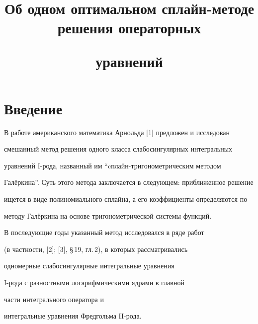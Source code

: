 

\title{Об одном оптимальном сплайн-методе решения операторных


уравнений}





\date{}




\pagestyle{plain} %







\maketitle


\label{begin}








\section*{Введение}





В работе американского математика Арнольда [1] предложен и исследован


смешанный метод решения одного класса слабосингулярных интегральных


уравнений I-рода, названный им ``cплайн-тригонометрическим методом


Гал\"еркина''. Суть этого метода заключается в следующем: приближенное решение


ищется в виде полиномиального сплайна, а его коэффициенты определяются по


методу Гал\"еркина на основе тригонометрической системы функций.


В последующие годы указанный метод исследовался в ряде работ


(в частности, [2]; [3], \S\,19, гл.\,2), в которых рассматривались 


одномерные слабосингулярные интегральные уравнения


I-рода с разностными логарифмическими ядрами в главной 


части интегрального оператора и


интегральные уравнения Фредгольма II-рода.





